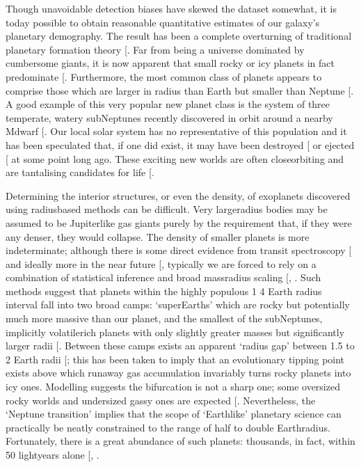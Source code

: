 \documentclass[letterpaper,10pt,english]{jupyterBook}
\begin{document}
\sphinxAtStartPar
Though unavoidable detection biases have skewed the dataset somewhat, it is today possible to obtain reasonable quantitative estimates of our galaxy’s planetary demography. The result has been a complete overturning of traditional planetary formation theory {[}\sphinxcite{references:id201}{]}. Far from being a universe dominated by cumbersome giants, it is now apparent that small rocky or icy planets in fact predominate {[}\sphinxcite{references:id471}{]}. Furthermore, the most common class of planets appears to comprise those which are larger in radius than Earth but smaller than Neptune {[}\sphinxcite{references:id210}{]}. A good example of this very popular new planet class is the system of three temperate, watery sub\sphinxhyphen{}Neptunes recently discovered in orbit around a nearby M\sphinxhyphen{}dwarf {[}\sphinxcite{references:id206}{]}. Our local solar system has no representative of this population and it has been speculated that, if one did exist, it may have been destroyed {[}\sphinxcite{references:id454}{]} or ejected {[}\sphinxcite{references:id205}{]} at some point long ago. These exciting new worlds are often close\sphinxhyphen{}orbiting and are tantalising candidates for life {[}\sphinxcite{references:id199}{]}.

\sphinxAtStartPar
Determining the interior structures, or even the density, of exoplanets discovered using radius\sphinxhyphen{}based methods can be difficult. Very large\sphinxhyphen{}radius bodies may be assumed to be Jupiter\sphinxhyphen{}like gas giants purely by the requirement that, if they were any denser, they would collapse. The density of smaller planets is more indeterminate; although there is some direct evidence from transit spectroscopy {[}\sphinxcite{references:id207}{]} and ideally more in the near future {[}\sphinxcite{references:id213}{]}, typically we are forced to rely on a combination of statistical inference and broad mass\sphinxhyphen{}radius scaling {[}, \sphinxcite{references:id450}{]}. Such methods suggest that planets within the highly populous 1 \sphinxhyphen{} 4 Earth radius interval fall into two broad camps: ‘super\sphinxhyphen{}Earths’ which are rocky but potentially much more massive than our planet, and the smallest of the sub\sphinxhyphen{}Neptunes, implicitly volatile\sphinxhyphen{}rich planets with only slightly greater masses but significantly larger radii {[}\sphinxcite{references:id420}{]}. Between these camps exists an apparent ‘radius gap’ between 1.5 to 2 Earth radii {[}\sphinxcite{references:id214}{]}; this has been taken to imply that an evolutionary tipping point exists above which runaway gas accumulation invariably turns rocky planets into icy ones. Modelling suggests the bifurcation is not a sharp one; some oversized rocky worlds and undersized gassy ones are expected {[}\sphinxcite{references:id208}{]}. Nevertheless, the ‘Neptune transition’ implies that the scope of ‘Earth\sphinxhyphen{}like’ planetary science can practically be neatly constrained to the range of half to double Earth\sphinxhyphen{}radius. Fortunately, there is a great abundance of such planets: thousands, in fact, within 50 lightyears alone {[}, \sphinxcite{references:id462}{]}.
\end{document}

